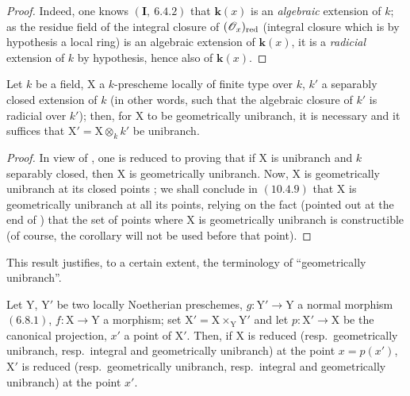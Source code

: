 \begin{proof}
Indeed, one knows $(\mathbf{I},~6.4.2)$ that $\boldsymbol{k}(x)$ is an \emph{algebraic} extension of $k$; as the
residue field of the integral closure of $(\mathscr{O}_x)_{\mathrm{red}}$ (integral closure which is by hypothesis
a local ring) is an algebraic extension of $\boldsymbol{k}(x)$, it is a \emph{radicial} extension of $k$
by hypothesis, hence also of $\boldsymbol{k}(x)$.
\end{proof}

\begin{corollary}[6.15.9]
\label{IV.6.15.9}
Let $k$ be a field, $\mathrm{X}$ a $k$-prescheme locally of finite type over $k$,
$k'$ a separably closed extension of $k$ \textup{(in other words, such that the algebraic closure of $k'$
is radicial over $k'$)}; then, for $\mathrm{X}$ to be geometrically unibranch, it is necessary and it suffices
that $\mathrm{X}'=\mathrm{X}\otimes_k k'$ be unibranch.
\end{corollary}

\begin{proof}
In view of , one is reduced to proving that if $\mathrm{X}$ is unibranch and $k$
separably closed, then $\mathrm{X}$ is geometrically unibranch. Now, $\mathrm{X}$ is geometrically
unibranch at its closed points ; we shall conclude in $(10.4.9)$ that $\mathrm{X}$
is geometrically unibranch at all its points, relying on the fact (pointed out
at the end of ) that the set of points where $\mathrm{X}$ is geometrically unibranch
is constructible (of course, the corollary  will not be used before that point).
\end{proof}

This result justifies, to a certain extent, the terminology of ``geometrically
unibranch''.

\begin{proposition}[6.15.10]
\label{IV.6.15.10}
Let $\mathrm{Y}$, $\mathrm{Y}'$ be two locally Noetherian preschemes, $g:\mathrm{Y}'\to\mathrm{Y}$ a
normal morphism $(6.8.1)$, $f:\mathrm{X}\to\mathrm{Y}$ a morphism; set $\mathrm{X}'=\mathrm{X}\times_\mathrm{Y}\mathrm{Y}'$ and let $p:\mathrm{X}'\to\mathrm{X}$
be the canonical projection, $x'$ a point of $\mathrm{X}'$. Then, if $\mathrm{X}$ is reduced \textup{(resp.}\ geometrically unibranch,
\textup{resp.}\ integral and geometrically unibranch\textup{)} at the point $x=p(x')$, $\mathrm{X}'$ is reduced \textup{(resp.}\ geometrically
unibranch, \textup{resp.}\ integral and geometrically unibranch\textup{)} at the point $x'$.
\end{proposition}

